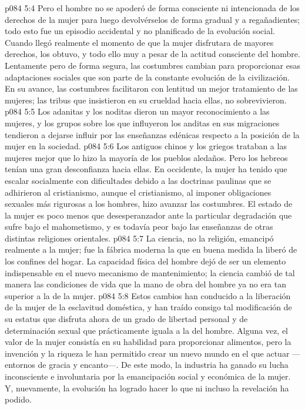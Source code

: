 \vs p084 5:4 Pero el hombre no se apoderó de forma consciente ni intencionada de los derechos de la mujer para luego devolvérselos de forma gradual y a regañadientes; todo esto fue un episodio accidental y no planificado de la evolución social. Cuando llegó realmente el momento de que la mujer disfrutara de mayores derechos, los obtuvo, y todo ello muy a pesar de la actitud consciente del hombre. Lentamente pero de forma segura, las costumbres cambian para proporcionar esas adaptaciones sociales que son parte de la constante evolución de la civilización. En su avance, las costumbres facilitaron con lentitud un mejor tratamiento de las mujeres; las tribus que insistieron en su crueldad hacia ellas, no sobrevivieron.
\vs p084 5:5 \pc Los adanitas y los noditas dieron un mayor reconocimiento a las mujeres, y los grupos sobre los que influyeron los anditas en sus migraciones tendieron a dejarse influir por las enseñanzas edénicas respecto a la posición de la mujer en la sociedad.
\vs p084 5:6 Los antiguos chinos y los griegos trataban a las mujeres mejor que lo hizo la mayoría de los pueblos aledaños. Pero los hebreos tenían una gran desconfianza hacia ellas. En occidente, la mujer ha tenido que escalar socialmente con dificultades debido a las doctrinas paulinas que se adhirieron al cristianismo, aunque el cristianismo, al imponer obligaciones sexuales más rigurosas a los hombres, hizo avanzar las costumbres. El estado de la mujer es poco menos que desesperanzador ante la particular degradación que sufre bajo el mahometismo, y es todavía peor bajo las enseñanzas de otras distintas religiones orientales.
\vs p084 5:7 \pc La ciencia, no la religión, emancipó realmente a la mujer; fue la fábrica moderna la que en buena medida la liberó de los confines del hogar. La capacidad física del hombre dejó de ser un elemento indispensable en el nuevo mecanismo de mantenimiento; la ciencia cambió de tal manera las condiciones de vida que la mano de obra del hombre ya no era tan superior a la de la mujer.
\vs p084 5:8 Estos cambios han conducido a la liberación de la mujer de la esclavitud doméstica, y han traído consigo tal modificación de su estatus que disfruta ahora de un grado de libertad personal y de determinación sexual que prácticamente iguala a la del hombre. Alguna vez, el valor de la mujer consistía en su habilidad para proporcionar alimentos, pero la invención y la riqueza le han permitido crear un nuevo mundo en el que actuar ---entornos de gracia y encanto---. De este modo, la industria ha ganado su lucha inconsciente e involuntaria por la emancipación social y económica de la mujer. Y, nuevamente, la evolución ha logrado hacer lo que ni incluso la revelación ha podido.
